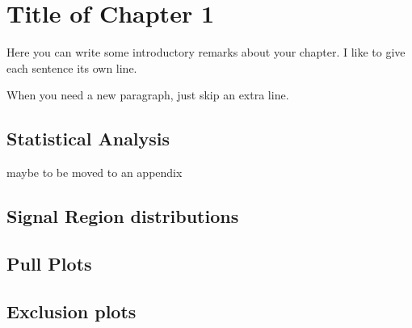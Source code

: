 

\chapter[Results][Top of Page Title]{Title of Chapter 1}

Here you can write some introductory remarks about your chapter.
I like to give each sentence its own line.

When you need a new paragraph, just skip an extra line.

\section{Statistical Analysis}

maybe to be moved to an appendix

\section{Signal Region distributions}

\section{Pull Plots}

\section{Exclusion plots}
